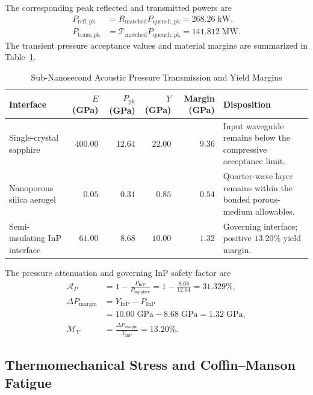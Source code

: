 \documentclass[10pt,twocolumn]{IEEEtran}
\begin{document}
The corresponding peak reflected and transmitted powers are
\begin{equation}
\begin{aligned}
P_{\mathrm{refl,pk}}&=R_{\mathrm{matched}}P_{\mathrm{quench,pk}}
=268.26\;\mathrm{kW}, \\
P_{\mathrm{trans,pk}}&=\mathcal T_{\mathrm{matched}}
P_{\mathrm{quench,pk}}
=141.812\;\mathrm{MW}.
\end{aligned}
\label{eq:quench_power_partition}
\end{equation}
The transient pressure acceptance values and material margins are summarized in Table~\ref{tab:acoustic_stress}.

\begin{table}[t]
\caption{Sub-Nanosecond Acoustic Pressure Transmission and Yield Margins}
\label{tab:acoustic_stress}
\centering
\footnotesize
\begin{tabular}{@{}lrrrrp{4.2cm}@{}}
\toprule
Interface & $E$ (GPa) & $P_{\mathrm{pk}}$ (GPa) & $Y$ (GPa) & Margin (GPa) & Disposition \\
\midrule
Single-crystal sapphire & $400.00$ & $12.64$ & $22.00$ & $9.36$ & Input waveguide remains below the compressive acceptance limit. \\
Nanoporous silica aerogel & $0.05$ & $0.31$ & $0.85$ & $0.54$ & Quarter-wave layer remains within the bonded porous-medium allowables. \\
Semi-insulating InP interface & $61.00$ & $8.68$ & $10.00$ & $1.32$ & Governing interface; positive $13.20\%$ yield margin. \\
\bottomrule
\end{tabular}
\end{table}

The pressure attenuation and governing InP safety factor are
\begin{equation}
\begin{aligned}
\mathcal A_P&=1-\frac{P_{\mathrm{InP}}}{P_{\mathrm{sapphire}}}
=1-\frac{8.68}{12.64}=31.329\%, \\
\Delta P_{\mathrm{margin}}
&=Y_{\mathrm{InP}}-P_{\mathrm{InP}} \\
&=10.00\;\mathrm{GPa}-8.68\;\mathrm{GPa}
=1.32\;\mathrm{GPa}, \\
\mathcal M_Y&=\frac{\Delta P_{\mathrm{margin}}}{Y_{\mathrm{InP}}}
=13.20\%.
\end{aligned}
\label{eq:inp_pressure_margin}
\end{equation}

\subsection{Thermomechanical Stress and Coffin--Manson Fatigue}
\end{document}
